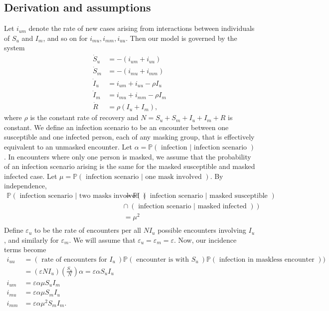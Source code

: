 \documentclass[11pt]{article}
\begin{document}
\subsection*{Derivation and assumptions}
Let $i_{um}$ denote the rate of new cases arising from interactions between individuals of $S_{u}$ and $I_{m}$, and so on for $i_{mu},i_{mm},i_{uu}$. Then our model is governed by the system
\begin{align*}
  \dot{S}_{u} &= -(i_{um}+i_{uu}) \\
  \dot{S}_{m} &= -(i_{mu}+i_{mm}) \\
  \dot{I}_{u} &= i_{um}+i_{uu}-\rho I_{u} \\
  \dot{I}_{m} &= i_{mu}+i_{mm}-\rho I_{m} \\
  \dot{R} &= \rho (I_{u}+I_{m}),
\end{align*}
where $\rho$ is the constant rate of recovery and $N = S_{u}+S_{m}+I_{u}+I_{m}+R$ is constant. We define an infection scenario to be an encounter between one susceptible and one infected person, each of any masking group, that is effectively equivalent to an unmasked encounter. Let $\alpha = \mathbb{P}(\text{ infection } | \text{ infection scenario })$. In encounters where only one person is masked, we assume that the probability of an infection scenario arising is the same for the masked susceptible and masked infected case. Let $\mu = \mathbb{P}(\text{ infection scenario } | \text{ one mask involved })$. By independence,
\begin{align*}
\mathbb{P}(\text{ infection scenario } | \text{ two masks involved }) &= \mathbb{P}(~(\text{ infection scenario } | \text{ masked susceptible })~ \\ &\cap ~(\text{ infection scenario } | \text{ masked infected })~)\\ &= \mu^{2} \\
\end{align*}
Define $\varepsilon_{u}$ to be the rate of encounters per all $N I_{u}$ possible encounters involving $I_{u}$, and similarly for $\varepsilon_{m}.$ We will assume that $\varepsilon_{u}= \varepsilon_{m}= \varepsilon$. Now, our incidence terms become
\begin{align*}
  i_{uu}&=(\text{ rate of encounters for } I_{u} ~)\mathbb{P}(\text{ encounter is with } S_u ~)\mathbb{P}(\text{ infection in maskless encounter }) )\\
        &= (\varepsilon N I_{u})(\frac{S_{u}}{N}) \alpha = \varepsilon \alpha S_{u}I_{u}\\
  i_{um}&=\varepsilon \alpha \mu S_{u} I_{m}\\
  i_{mu}&=\varepsilon \alpha \mu S_{m} I_{u}\\
  i_{mm}&=\varepsilon \alpha \mu^{2}S_{m}I_{m}.
\end{align*}
\end{document}

